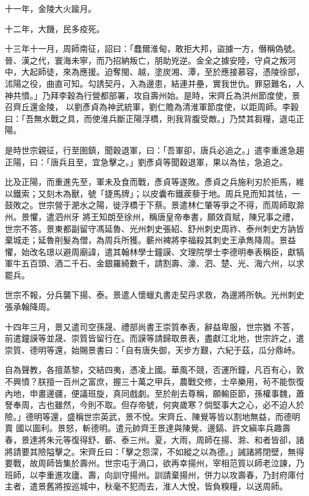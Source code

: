 \begin{pinyinscope}
 十一年，金陵大火踰月。



 十二年，大饑，民多疫死。



 十三年十一月，周師南征，詔曰：「蠢爾淮甸，敢拒大邦，盜據一方，僭稱偽號。晉、漢之代，寰海未寧，而乃招納叛亡，朋助兇逆。金全之據安陸，守貞之叛河中，大起師徒，來為應援。迫奪閩、越，塗炭湘、潭，至於應接慕容，憑陵徐部，沭陽之役，曲直可知。勾誘契丹，入為邊患，結連并壘，實我世仇。罪惡難名，人神共憤。」乃拜李穀為行營都部署，攻自壽州始。是時，宋齊丘為洪州節度使，景召齊丘還金陵，
 以劉彥貞為神武統軍，劉仁贍為清淮軍節度使，以距周師。李穀曰：「吾無水戰之具，而使淮兵斷正陽浮橋，則我背腹受敵。」乃焚其芻糧，退屯正陽。



 是時世宗親征，行至圉鎮，聞穀退軍，曰：「吾軍卻，唐兵必追之。」遣李重進急趨正陽，曰：「唐兵且至，宜急擊之。」劉彥貞等聞穀退軍，果以為怯，急追之。



 比及正陽，而重進先至，軍未及食而戰，彥貞等遂敗。彥貞之兵施利刃於拒馬，維以鐵索；又刻木為獸，號「捷馬牌」；以皮囊布鐵蒺藜于地。周兵見而知其怯，一鼓敗之。世宗營于淝水之陽，徙浮橋于下蔡。景遣林仁肇等爭之不得，而周師取滁州。景懼，遣泗州牙
 將王知朗至徐州，稱唐皇帝奉書，願效貢賦，陳兄事之禮，世宗不答。景東都副留守馮延魯、光州刺史張紹、舒州刺史周祚、泰州刺史方訥皆棄城走；延魯削髮為僧，為周兵所獲。蘄州裨將李福殺其刺史王承雋降周。景益懼，始改名璟以避周廟諱，遣其翰林學士鐘謨、文理院學士李德明奉表稱臣，獻犒軍牛五百頭、酒二千石、金銀羅綺數千，請割壽、濠、泗、楚、光、海六州，以求罷兵。



 世宗不報，分兵襲下揚、泰。景遣人懷蠟丸書走契丹求救，為邊將所執。光州刺史張承翰降周。



 十四年三月，景又遣司空孫晟、禮部尚書王崇質奉表，辭益卑服，世宗猶
 不答，前遣鐘謨等並晟、崇質皆留行在。而謨等請歸取景表，盡獻江北地，世宗許之，遣崇質、德明等還，始賜景書曰：「自有唐失御，天步方艱，六紀于茲，瓜分鼎峙。



 自為聲教，各擅蒸黎，交結四夷，憑凌上國。華風不競，否運所鐘，凡百有心，敦不興憤？朕擅一百州之富庶，握三十萬之甲兵，農戰交修，士卒樂用，茍不能恢復內地，申畫邊疆，便議班旋，真同戲劇。至於削去尊稱，願輸臣節，孫權事魏，蕭詧奉周，古也雖然，今則不取。但存帝號，何爽歲寒？倘堅事大之心，必不迫人於險。」德明等還，盛稱世宗英武，景不悅。宋齊丘、陳覺等皆以割地無益，而德明賣
 國以圖利。景怒，斬德明。遣元帥齊王景達與陳覺、邊鎬、許文縝率兵趣壽春，景達將朱元等復得舒、蘄、泰三州。夏，大雨，周師在揚、滁、和者皆卻，諸將請要其險隘擊之。宋齊丘曰：「擊之怨深，不如縱之以為德。」誡諸將閉壁，無得要戰，故周師皆集於壽州。世宗屯于渦口，欲再幸揚州，宰相范質以師老泣諫，乃班師，以李重進攻廬、壽，向訓守揚州。訓請棄揚州，併力以攻壽春，乃封府庫付主者，遣景舊將按巡城中，秋毫不犯而去，淮人大悅，皆負糗糧，以送周師。




\end{pinyinscope}
